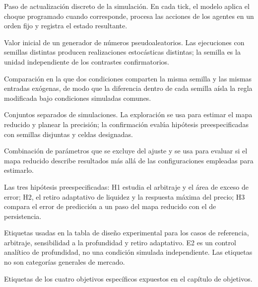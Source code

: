 \begin{description}[style=unboxed,leftmargin=0pt,labelwidth=0pt,labelsep=0.5em,itemsep=0.1em]
  \item[Tick:] Paso de actualización discreto de la simulación. En cada tick, el modelo aplica el choque programado cuando corresponde, procesa las acciones de los agentes en un orden fijo y registra el estado resultante.
  \item[Semilla:] Valor inicial de un generador de números pseudoaleatorios. Las ejecuciones con semillas distintas producen realizaciones estocásticas distintas; la semilla es la unidad independiente de los contrastes confirmatorios.
  \item[Diseño pareado:] Comparación en la que dos condiciones comparten la misma semilla y las mismas entradas exógenas, de modo que la diferencia dentro de cada semilla aísla la regla modificada bajo condiciones simuladas comunes.
  \item[Exploración y confirmación:] Conjuntos separados de simulaciones. La exploración se usa para estimar el mapa reducido y planear la precisión; la confirmación evalúa hipótesis preespecificadas con semillas disjuntas y celdas designadas.
  \item[Configuración reservada:] Combinación de parámetros que se excluye del ajuste y se usa para evaluar si el mapa reducido describe resultados más allá de las configuraciones empleadas para estimarlo.
  \item[H1--H3:] Las tres hipótesis preespecificadas: H1 estudia el arbitraje y el área de exceso de error; H2, el retiro adaptativo de liquidez y la respuesta máxima del precio; H3 compara el error de predicción a un paso del mapa reducido con el de persistencia.
  \item[E0--E3:] Etiquetas usadas en la tabla de diseño experimental para los casos de referencia, arbitraje, sensibilidad a la profundidad y retiro adaptativo. E2 es un control analítico de profundidad, no una condición simulada independiente. Las etiquetas no son categorías generales de mercado.
  \item[OE1--OE4:] Etiquetas de los cuatro objetivos específicos expuestos en el capítulo de objetivos.
\end{description}

